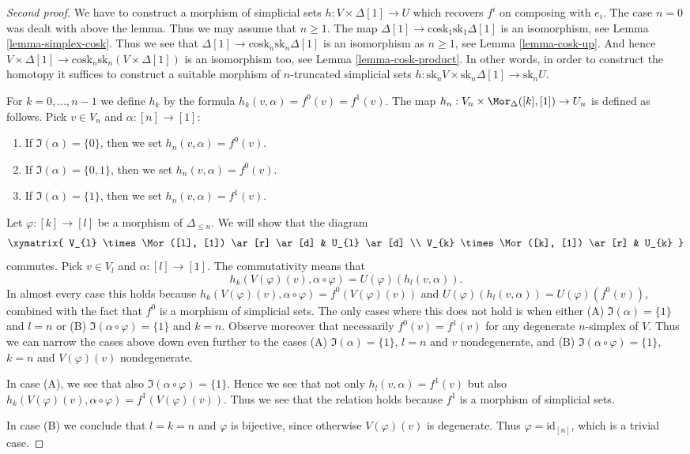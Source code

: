 \begin{proof}[Second proof]
We have to construct a morphism of simplicial sets
$h : V \times \Delta[1] \to U$ which recovers $f^i$ on composing with $e_i$.
The case $n = 0$ was dealt with above the lemma.
Thus we may assume that $n \geq 1$.
The map $\Delta[1] \to \text{cosk}_1 \text{sk}_1 \Delta[1]$
is an isomorphism, see Lemma \ref{lemma-simplex-cosk}.
Thus we see that $\Delta[1] \to \text{cosk}_n \text{sk}_n \Delta[1]$
is an isomorphism as $n \geq 1$, see
Lemma \ref{lemma-cosk-up}. And hence $V \times \Delta[1] \to
\text{cosk}_n \text{sk}_n (V \times \Delta[1])$
is an isomorphism too, see Lemma \ref{lemma-cosk-product}.
In other words, in order to construct the homotopy
it suffices to construct a suitable
morphism of $n$-truncated simplicial sets
$h : \text{sk}_n V \times \text{sk}_n \Delta[1] \to \text{sk}_n U$.

\medskip\noindent
For $k = 0, \ldots, n - 1$ we define $h_k$ by the
formula $h_k(v, \alpha) = f^0(v) = f^1(v)$.
The map $h_n : V_n \times \Mor_{\Delta}([k], [1]) \to U_n$
is defined as follows. Pick $v \in V_n$ and $\alpha : [n] \to [1]$:
\begin{enumerate}
\item If $\Im(\alpha) = \{0\}$, then we set $h_n(v, \alpha) = f^0(v)$.
\item If $\Im(\alpha) = \{0, 1\}$, then we set $h_n(v, \alpha) = f^0(v)$.
\item If $\Im(\alpha) = \{1\}$, then we set $h_n(v, \alpha) = f^1(v)$.
\end{enumerate}
Let $\varphi : [k] \to [l]$ be a morphism of $\Delta_{\leq n}$.
We will show that the diagram
$$
\xymatrix{
V_{l} \times \Mor([l], [1]) \ar[r] \ar[d] & U_{l} \ar[d] \\
V_{k} \times \Mor([k], [1]) \ar[r] & U_{k}
}
$$
commutes.
Pick $v \in V_{l}$ and $\alpha : [l] \to [1]$.
The commutativity means that
$$
h_k(V(\varphi)(v), \alpha \circ \varphi)
=
U(\varphi)(h_l(v, \alpha)).
$$
In almost every case this holds because
$h_k(V(\varphi)(v), \alpha \circ \varphi) = f^0(V(\varphi)(v))$
and $U(\varphi)(h_l(v, \alpha)) = U(\varphi)(f^0(v))$, combined
with the fact that $f^0$ is a morphism of simplicial sets.
The only cases where this does not hold is when
either (A) $\Im(\alpha) = \{1\}$ and $l = n$
or (B) $\Im(\alpha \circ \varphi) = \{1\}$ and $k = n$.
Observe moreover that necessarily $f^0(v) = f^1(v)$
for any degenerate $n$-simplex of $V$.
Thus we can narrow the cases above down even further
to the cases (A) $\Im(\alpha) = \{1\}$, $l = n$
and $v$ nondegenerate, and (B)
$\Im(\alpha \circ \varphi) = \{1\}$, $k = n$
and $V(\varphi)(v)$ nondegenerate.

\medskip\noindent
In case (A), we see that also $\Im(\alpha \circ \varphi) = \{1\}$.
Hence we see that not only $h_l(v, \alpha) = f^1(v)$ but also
$h_k(V(\varphi)(v), \alpha \circ \varphi) = f^1(V(\varphi)(v))$.
Thus we see that the relation holds because $f^1$ is a morphism
of simplicial sets.

\medskip\noindent
In case (B) we conclude that $l = k = n$ and
$\varphi$ is bijective, since otherwise $V(\varphi)(v)$
is degenerate. Thus $\varphi = \text{id}_{[n]}$, which is a trivial case.
\end{proof}

